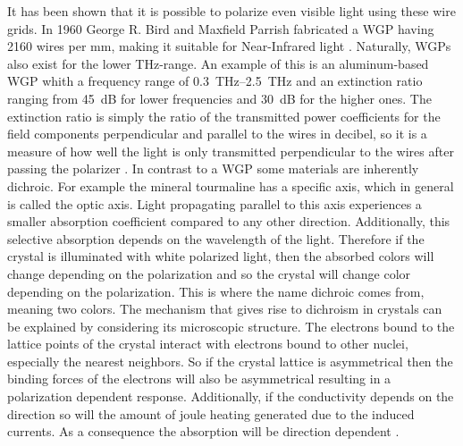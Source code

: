 It has been shown that it is possible to polarize even visible light using these wire grids. In 1960 George R. Bird and Maxfield Parrish fabricated a WGP having 2160 wires per mm, making it suitable for Near-Infrared light \cite{Bird1960ThePolarizer}. Naturally, WGPs also exist for the lower THz-range. An example of this is an aluminum-based WGP whith a frequency range of \SIrange{0.3}{2.5}{\tera \hertz} and an extinction ratio ranging from \SI{45}{\dB} for lower frequencies and \SI{30}{\dB} for the higher ones. The extinction ratio is simply the ratio of the transmitted power coefficients for the field components perpendicular and parallel to the wires in decibel, so it is a measure of how well the light is only transmitted perpendicular to the wires after passing the polarizer \cite{Ferraro2016FlexibleLoss}. 
In contrast to a WGP some materials are inherently dichroic. For example the mineral tourmaline has a specific axis, which in general is called the optic axis. Light propagating parallel to this axis experiences a smaller absorption coefficient compared to any other direction. Additionally, this selective absorption depends on the wavelength of the light. Therefore if the crystal is illuminated with white polarized light, then the absorbed colors will change depending on the polarization and so the crystal will change color depending on the polarization. This is where the name dichroic comes from, meaning two colors. The mechanism that gives rise to dichroism in crystals can be explained by considering its microscopic structure. The electrons bound to the lattice points of the crystal interact with electrons bound to other nuclei, especially the nearest neighbors. So if the crystal lattice is asymmetrical then the binding forces of the electrons will also be asymmetrical resulting in a polarization dependent response. Additionally, if the conductivity depends on the direction so will the amount of joule heating generated due to the induced currents. As a consequence the absorption will be direction dependent \cite{HechtOpticsEdition}.

